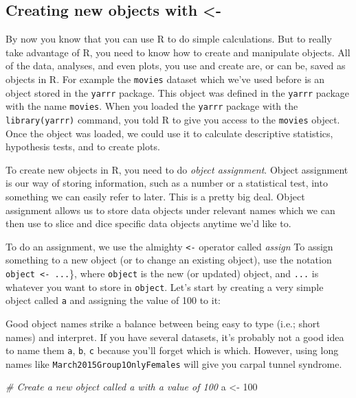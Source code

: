 \documentclass[]{book}
\newenvironment{Shaded}{\begin{snugshade}}{\end{snugshade}}
\newcommand{\DecValTok}[1]{\textcolor[rgb]{0.00,0.00,0.81}{#1}}
\newcommand{\StringTok}[1]{\textcolor[rgb]{0.31,0.60,0.02}{#1}}
\newcommand{\CommentTok}[1]{\textcolor[rgb]{0.56,0.35,0.01}{\textit{#1}}}
\newcommand{\NormalTok}[1]{#1}
\theoremstyle{definition}
\theoremstyle{definition}
\theoremstyle{remark}
\begin{document}
\subsection{Creating new objects with
\textless{}-}\label{creating-new-objects-with--}

By now you know that you can use R to do simple calculations. But to
really take advantage of R, you need to know how to create and
manipulate objects. All of the data, analyses, and even plots, you use
and create are, or can be, saved as objects in R. For example the
\texttt{movies} dataset which we've used before is an object stored in
the \texttt{yarrr} package. This object was defined in the
\texttt{yarrr} package with the name \texttt{movies}. When you loaded
the \texttt{yarrr} package with the
\texttt{library(\textquotesingle{}yarrr\textquotesingle{})} command, you
told R to give you access to the \texttt{movies} object. Once the object
was loaded, we could use it to calculate descriptive statistics,
hypothesis tests, and to create plots.

To create new objects in R, you need to do \emph{object assignment}.
Object assignment is our way of storing information, such as a number or
a statistical test, into something we can easily refer to later. This is
a pretty big deal. Object assignment allows us to store data objects
under relevant names which we can then use to slice and dice specific
data objects anytime we'd like to.

To do an assignment, we use the almighty \texttt{\textless{}-} operator
called \emph{assign} To assign something to a new object (or to change
an existing object), use the notation
\texttt{object\ \textless{}-\ ...}\}, where \texttt{object} is the new
(or updated) object, and \texttt{...} is whatever you want to store in
\texttt{object}. Let's start by creating a very simple object called
\texttt{a} and assigning the value of 100 to it:

Good object names strike a balance between being easy to type (i.e.;
short names) and interpret. If you have several datasets, it's probably
not a good idea to name them \texttt{a}, \texttt{b}, \texttt{c} because
you'll forget which is which. However, using long names like
\texttt{March2015Group1OnlyFemales} will give you carpal tunnel
syndrome.

\begin{Shaded}
\begin{Highlighting}[]
\CommentTok{# Create a new object called a with a value of 100}
\NormalTok{a <-}\StringTok{ }\DecValTok{100}
\end{Highlighting}
\end{Shaded}
\end{document}
